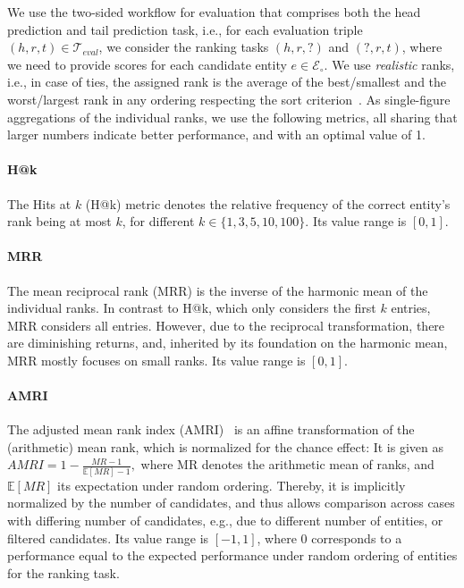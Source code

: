 \documentclass[sigconf,screen]{acmart}
\begin{document}
We use the two-sided workflow for evaluation that comprises both the head prediction and tail prediction task, i.e., for each evaluation triple $(h, r, t) \in \mathcal{T}_{eval}$, we consider the ranking tasks $(h, r, ?)$ and $(?, r, t)$, where we need to provide scores for each candidate entity $e \in \mathcal{E}_{\circ}$.
We use \textit{realistic} ranks, i.e., in case of ties, the assigned rank is the average of the best/smallest and the worst/largest rank in any ordering respecting the sort criterion~\cite{Berrendorf2020}.
As single-figure aggregations of the individual ranks, we use the following metrics, all sharing that larger numbers indicate better performance, and with an optimal value of 1.

\paragraph{\textbf{H@k}}
The Hits at $k$ (H@k) metric denotes the relative frequency of the correct entity's rank being at most $k$, for different $k\in\{1, 3, 5, 10, 100\}$.
Its value range is $[0, 1]$.

\paragraph{\textbf{MRR}}
The mean reciprocal rank (MRR) is the inverse of the harmonic mean of the individual ranks.
In contrast to H@k, which only considers the first $k$ entries, MRR considers all entries.
However, due to the reciprocal transformation, there are diminishing returns, and, inherited by its foundation on the harmonic mean, MRR mostly focuses on small ranks.
Its value range is $[0, 1]$.

\paragraph{\textbf{AMRI}}
The adjusted mean rank index (AMRI)~ \cite{Berrendorf2020} is an affine transformation of the (arithmetic) mean rank, which is normalized for the chance effect:
It is given as
$
AMRI = 1 - \frac{MR - 1}{\mathbb{E}[MR] - 1},
$
where MR denotes the arithmetic mean of ranks, and $\mathbb{E}[MR]$ its expectation under random ordering.
Thereby, it is implicitly normalized by the number of candidates, and thus allows comparison across cases with differing number of candidates, e.g., due to different number of entities, or filtered candidates.
Its value range is $[-1, 1]$, where 0 corresponds to a performance equal to the expected performance under random ordering of entities for the ranking task.
\end{document}
